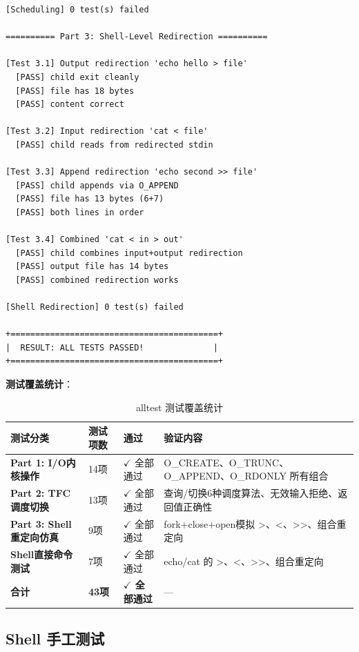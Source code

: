 \documentclass[12pt,a4paper]{ctexart}
\begin{document}
\begin{lstlisting}[caption={alltest 完整运行结果（43项全部通过）}]
[Scheduling] 0 test(s) failed

========== Part 3: Shell-Level Redirection ==========

[Test 3.1] Output redirection 'echo hello > file'
  [PASS] child exit cleanly
  [PASS] file has 18 bytes
  [PASS] content correct

[Test 3.2] Input redirection 'cat < file'
  [PASS] child reads from redirected stdin

[Test 3.3] Append redirection 'echo second >> file'
  [PASS] child appends via O_APPEND
  [PASS] file has 13 bytes (6+7)
  [PASS] both lines in order

[Test 3.4] Combined 'cat < in > out'
  [PASS] child combines input+output redirection
  [PASS] output file has 14 bytes
  [PASS] combined redirection works

[Shell Redirection] 0 test(s) failed

+==========================================+
|  RESULT: ALL TESTS PASSED!              |
+==========================================+
\end{lstlisting}

\textbf{测试覆盖统计}：

\begin{table}[H]
\centering
\caption{alltest 测试覆盖统计}
\begin{tabular}{>{\bfseries}p{3.5cm}p{2cm}p{2.5cm}p{5cm}}
\toprule
\textbf{测试分类} & \textbf{测试项数} & \textbf{通过} & \textbf{验证内容} \\
\midrule
Part 1: I/O内核操作 & 14项 & $\checkmark$ 全部通过 & O\_CREATE、O\_TRUNC、O\_APPEND、O\_RDONLY 所有组合 \\
Part 2: TFC调度切换 & 13项 & $\checkmark$ 全部通过 & 查询/切换6种调度算法、无效输入拒绝、返回值正确性 \\
Part 3: Shell重定向仿真 & 9项 & $\checkmark$ 全部通过 & fork+close+open模拟 >、<、>>、组合重定向 \\
Shell直接命令测试 & 7项 & $\checkmark$ 全部通过 & echo/cat 的 >、<、>>、组合重定向 \\
\hline
\textbf{合计} & \textbf{43项} & \textbf{$\checkmark$ 全部通过} & — \\
\bottomrule
\end{tabular}
\end{table}

\subsection{Shell 手工测试}
\end{document}
